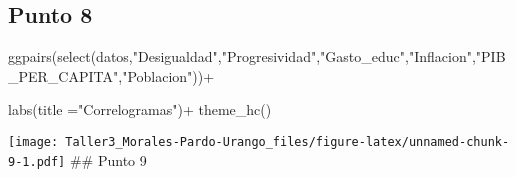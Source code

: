 \documentclass[
]{article}
\newenvironment{Shaded}{\begin{snugshade}}{\end{snugshade}}
\newcommand{\AttributeTok}[1]{\textcolor[rgb]{0.77,0.63,0.00}{#1}}
\newcommand{\FunctionTok}[1]{\textcolor[rgb]{0.00,0.00,0.00}{#1}}
\newcommand{\NormalTok}[1]{#1}
\newcommand{\SpecialCharTok}[1]{\textcolor[rgb]{0.00,0.00,0.00}{#1}}
\newcommand{\StringTok}[1]{\textcolor[rgb]{0.31,0.60,0.02}{#1}}
\begin{document}
\hypertarget{punto-8}{%
\subsection{Punto 8}\label{punto-8}}

\begin{Shaded}
\begin{Highlighting}[]
\FunctionTok{ggpairs}\NormalTok{(}\FunctionTok{select}\NormalTok{(datos,}\StringTok{"Desigualdad"}\NormalTok{,}\StringTok{"Progresividad"}\NormalTok{,}\StringTok{"Gasto\_educ"}\NormalTok{,}\StringTok{"Inflacion"}\NormalTok{,}\StringTok{"PIB\_PER\_CAPITA"}\NormalTok{,}\StringTok{"Poblacion"}\NormalTok{))}\SpecialCharTok{+}
  
  \FunctionTok{labs}\NormalTok{(}\AttributeTok{title =}\StringTok{"Correlogramas"}\NormalTok{)}\SpecialCharTok{+}
  \FunctionTok{theme\_hc}\NormalTok{()}
\end{Highlighting}
\end{Shaded}

\texttt{[image: Taller3\_Morales-Pardo-Urango\_files/figure-latex/unnamed-chunk-9-1.pdf]}
\#\# Punto 9
\end{document}
